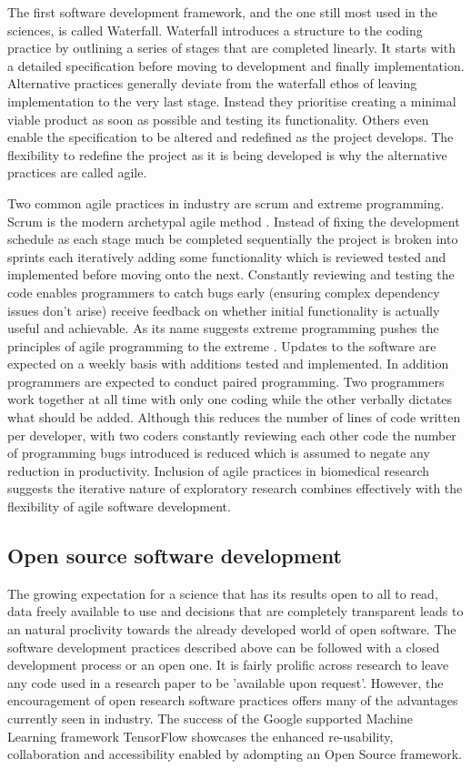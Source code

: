 \documentclass[../main.tex]{subfiles}
\begin{document}
The first software development framework, and the one still most used in the sciences, is called Waterfall.
Waterfall introduces a structure to the coding practice by outlining a series of stages that are completed linearly.
It starts with a detailed specification before moving to development and finally implementation.
Alternative practices generally deviate from the waterfall ethos of leaving implementation to the very last stage.
Instead they prioritise creating a minimal viable product as soon as possible and testing its functionality.
Others even enable the specification to be altered and redefined as the project develops.
The flexibility to redefine the project as it is being developed is why the alternative practices are called agile. 

Two common agile practices in industry are scrum and extreme programming.
Scrum is the modern archetypal agile method \parencite{Schwaber2020}.
Instead of fixing the development schedule as each stage much be completed sequentially the project is broken into sprints each iteratively adding some functionality which is reviewed tested and implemented before moving onto the next.
Constantly reviewing and testing the code enables programmers to catch bugs early (ensuring complex dependency issues don't arise) receive feedback on whether initial functionality is actually useful and achievable.
As its name suggests extreme programming pushes the principles of agile programming to the extreme \parencite{Beck2004}.
Updates to the software are expected on a weekly basis with additions tested and implemented. 
In addition programmers are expected to conduct paired programming. 
Two programmers work together at all time with only one coding while the other verbally dictates what should be added. 
Although this reduces the number of lines of code written per developer, with two coders constantly reviewing each other code the number of programming bugs introduced is reduced which is assumed to negate any reduction in productivity.
Inclusion of agile practices in biomedical research suggests the iterative nature of exploratory research combines effectively with the flexibility of agile software development\parencite{kane2006}.

\subsection{Open source software development}

The growing expectation for a science that has its results open to all to read, data freely available to use and decisions that are completely transparent leads to an natural proclivity towards the already developed world of open software. 
The software development practices described above can be followed with a closed development process or an open one. 
It is fairly prolific across research to leave any code used in a research paper to be 'available upon request'. However, the encouragement of open research software practices offers many of the advantages currently seen in industry. 
The success of the Google supported Machine Learning framework TensorFlow showcases the enhanced re-usability, collaboration and accessibility enabled by adompting an Open Source framework. 
\end{document}
